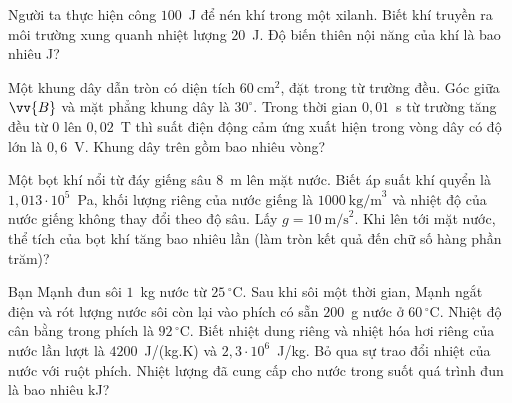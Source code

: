 	\begin{ex}%
		Người ta thực hiện công $100$~J để nén khí trong một xilanh. Biết khí truyền ra môi trường xung quanh nhiệt lượng $20$~J. Độ biến thiên nội năng của khí là bao nhiêu J?
		\par
	\end{ex}

	\begin{ex}%
		Một khung dây dẫn tròn có diện tích $60~\text{cm}^2$, đặt trong từ trường đều. Góc giữa $\vv{B}$ và mặt phẳng khung dây là $30^\circ$. Trong thời gian $0{,}01$~s từ trường tăng đều từ $0$ lên $0{,}02$~T thì suất điện động cảm ứng xuất hiện trong vòng dây có độ lớn là $0{,}6$~V. Khung dây trên gồm bao nhiêu vòng?
		\par
	\end{ex}

	\begin{ex}%
		Một bọt khí nổi từ đáy giếng sâu $8$~m lên mặt nước. Biết áp suất khí quyển là $1{,}013\cdot 10^5$~Pa, khối lượng riêng của nước giếng là $1000~\text{kg/m}^3$ và nhiệt độ của nước giếng không thay đổi theo độ sâu. Lấy $g=10~\text{m/s}^2$. Khi lên tới mặt nước, thể tích của bọt khí tăng bao nhiêu lần (làm tròn kết quả đến chữ số hàng phần trăm)?
		\par
	\end{ex}

	\begin{ex}%
		Bạn Mạnh đun sôi $1$~kg nước từ $25\,^\circ\text{C}$. Sau khi sôi một thời gian, Mạnh ngắt điện và rót lượng nước sôi còn lại vào phích có sẵn $200$~g nước ở $60\,^\circ\text{C}$. Nhiệt độ cân bằng trong phích là $92\,^\circ\text{C}$. Biết nhiệt dung riêng và nhiệt hóa hơi riêng của nước lần lượt là $4200$~J/(kg.K) và $2{,}3\cdot 10^6$~J/kg. Bỏ qua sự trao đổi nhiệt của nước với ruột phích. Nhiệt lượng đã cung cấp cho nước trong suốt quá trình đun là bao nhiêu kJ?
		\par
	\end{ex}

